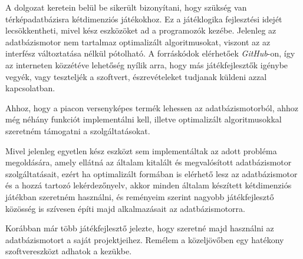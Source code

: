 
A dolgozat keretein belül be sikerült bizonyítani, hogy szükség van térképadatbázisra kétdimenziós játékokhoz.
Ez a játéklogika fejlesztési idejét lecsökkentheti, mivel kész eszközöket ad a programozók kezébe. Jelenleg az adatbázismotor nem tartalmaz optimalizált algoritmusokat, viszont az az interfész változtatása nélkül pótolható. A forráskódok elérhetőek \textit{GitHub}-on, így az interneten közzétéve lehetőség nyílik arra, hogy más játékfejlesztők igénybe vegyék, vagy teszteljék a szoftvert, észrevételeket tudjanak küldeni azzal kapcsolatban.

Ahhoz, hogy a piacon versenyképes termék lehessen az adatbázismotorból, ahhoz még néhány funkciót implementálni kell, illetve optimalizált algoritmusokkal szeretném támogatni a szolgáltatásokat.

Mivel jelenleg egyetlen kész eszközt sem implementáltak az adott probléma megoldására, amely ellátná az általam kitalált és megvalósított adatbázismotor szolgáltatásait, ezért ha optimalizált formában is elérhető lesz az adatbázismotor és a hozzá tartozó lekérdezőnyelv, akkor minden általam készített kétdimenziós játékban szeretném használni, és reményeim szerint nagyobb játékfejlesztő közösség is szívesen építi majd alkalmazásait az adatbázismotorra.

Korábban már több játékfejlesztő jelezte, hogy szeretné majd használni az adatbázismotort a saját projektjeihez. Remélem a közeljövőben egy hatékony szoftvereszközt adhatok a kezükbe.

